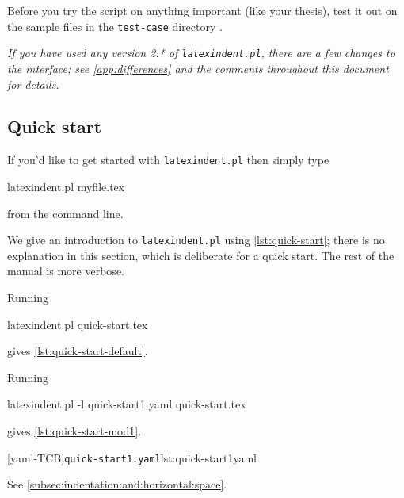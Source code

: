  \begin{warning}
  Before you try the script on anything important (like your thesis), test it out on the
  sample files in the \texttt{test-case} directory \cite{latexindent-home}.
 \end{warning}

 \emph{If you have used any version 2.* of \texttt{latexindent.pl}, there
 are a few changes to the interface; see \vref{app:differences} and the comments
 throughout this document for details}.

\subsection{Quick start}\label{sec:quickstart}
 If you'd like to get started with \texttt{latexindent.pl} then simply type

 \begin{commandshell}
latexindent.pl myfile.tex
\end{commandshell}

 from the command line.

 We give an introduction to \texttt{latexindent.pl} using \cref{lst:quick-start}; there
 is no explanation in this section, which is deliberate for a quick start. The rest of
 the manual is more verbose.


 Running

 \begin{commandshell}
latexindent.pl quick-start.tex
\end{commandshell}

 gives \cref{lst:quick-start-default}.


 \begin{example}
 Running

 \begin{commandshell}
latexindent.pl -l quick-start1.yaml quick-start.tex
\end{commandshell}

 gives \cref{lst:quick-start-mod1}.

 \begin{cmhtcbraster}
  [yaml-TCB]{\texttt{quick-start1.yaml}}{lst:quick-start1yaml}
 \end{cmhtcbraster}
 See \cref{subsec:indentation:and:horizontal:space}.
 \end{example}


